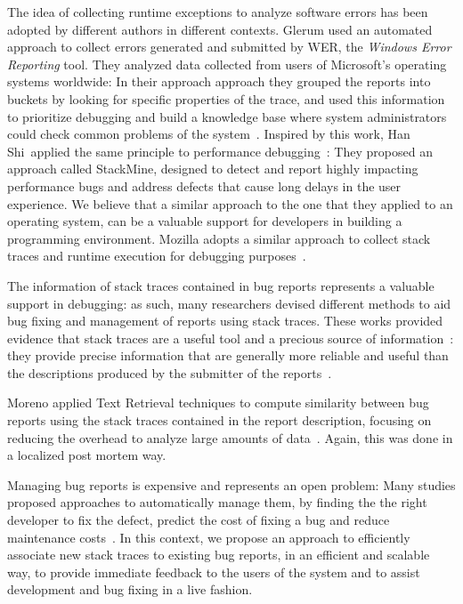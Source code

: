 The idea of collecting runtime exceptions to analyze software errors has been adopted by different authors in different contexts. Glerum \etal used an automated approach to collect errors generated and submitted by WER, the \emph{Windows Error Reporting} tool. They analyzed data collected from users of Microsoft's operating systems worldwide: In their approach approach they grouped the reports into buckets by looking for specific properties of the trace, and used this information to prioritize debugging and build a knowledge base where system administrators could check common problems of the system~\cite{Glerum2009}. Inspired by this work, Han Shi~\etal applied the same principle to performance debugging~\cite{Han2012}: They proposed an approach called StackMine, designed to detect and report highly impacting performance bugs and address defects that cause long delays in the user experience. We believe that a similar approach to the one that they applied to an operating system, can be a valuable support for developers in building a programming environment. Mozilla adopts a similar approach to collect stack traces and runtime execution for debugging purposes~\cite{McLa2004}.

The information of stack traces contained in bug reports represents a valuable support in debugging: as such, many researchers devised different methods to aid bug fixing and management of reports using stack traces. These works provided evidence that stack traces are a useful tool and a precious source of information~\cite{davie2013,Wang2013,Brod2005,Weiss2007a}: they provide precise information that are generally more reliable and useful than the descriptions produced by the submitter of the reports~\cite{Ko2006}.


Moreno \etal applied Text Retrieval techniques to compute similarity between bug reports using the stack traces contained in the report description, focusing on reducing the overhead to analyze large amounts of data~\cite{Moreno2014}. Again, this was done in a localized post mortem way.

Managing bug reports is expensive and represents an open problem: Many studies proposed approaches to automatically manage them, by finding the the right developer to fix the defect, predict the cost of fixing a bug and reduce maintenance costs~\cite{Matt2009,Anvik2006a,Sliw2005,DAmb2010c}. In this context, we propose an approach to efficiently associate new stack traces to existing bug reports, in an efficient and scalable way, to provide immediate feedback to the users of the system and to assist development and bug fixing in a live fashion.



